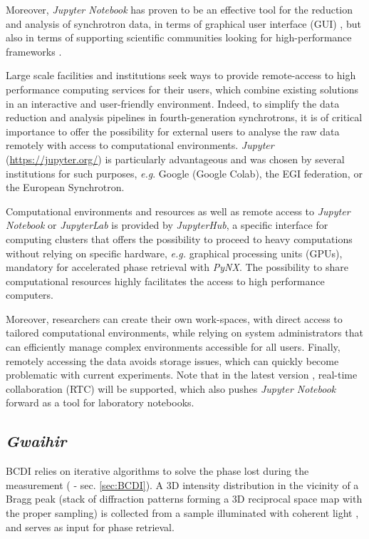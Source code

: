 Moreover, \textit{Jupyter Notebook} has proven to be an effective tool for the reduction and analysis of synchrotron data, in terms of graphical user interface (GUI) \parencite{Martini2019a,Simonne2020}, but also in terms of supporting scientific communities looking for high-performance frameworks \parencite{jupyter_computing_4, jupyter_computing_1, jupyter_computing_3, jupyter_computing_2, 9307800}.

Large scale facilities and institutions seek ways to provide remote-access to high performance computing services for their users, which combine existing solutions in an interactive and user-friendly environment.
Indeed, to simplify the data reduction and analysis pipelines in fourth-generation synchrotrons, it is of critical importance to offer the possibility for external users to analyse the raw data remotely with access to computational environments.
\textit{Jupyter} (\url{https://jupyter.org/}) is particularly advantageous and was chosen by several institutions for such purposes, \textit{e.g}. Google (Google Colab), the EGI federation, or the European Synchrotron.

Computational environments and resources as well as remote access to \textit{Jupyter Notebook} or \textit{JupyterLab} is provided by \textit{JupyterHub}, a specific interface for computing clusters that offers the possibility to proceed to heavy computations without relying on specific hardware, \textit{e.g.} graphical processing units (GPUs), mandatory for accelerated phase retrieval with \textit{PyNX}.
The possibility to share computational resources highly facilitates the access to high performance computers.

Moreover, researchers can create their own work-spaces, with direct access to tailored computational environments, while relying on system administrators that can efficiently manage complex environments accessible for all users.
Finally, remotely accessing the data avoids storage issues, which can quickly become problematic with current experiments.
Note that in the latest version \parencite{JupyterNotebook7}, real-time collaboration (RTC) will be supported, which also pushes \textit{Jupyter Notebook} forward as a tool for laboratory notebooks.

\subsection{\textit{Gwaihir}} \label{sec:Gwaihir}

BCDI relies on iterative algorithms to solve the phase lost during the measurement (\cite{robinson_coherent_2009} - sec. \ref{sec:BCDI}).
A 3D intensity distribution in the vicinity of a Bragg peak (stack of diffraction patterns forming a 3D reciprocal space map with the proper sampling) is collected from a sample illuminated with coherent light \parencite{robinson_coherent_2005}, and serves as input for phase retrieval.

